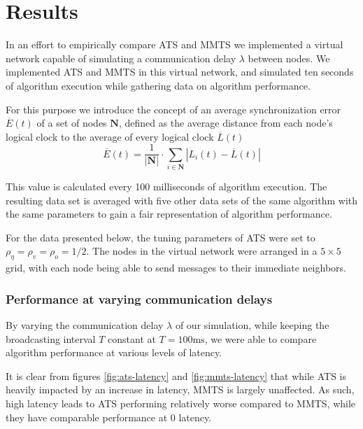 \documentclass[a4paper,12pt]{article}
\begin{document}
\section{Results}

In an effort to empirically compare ATS and MMTS we implemented a virtual network capable of simulating a communication delay $\lambda$ between nodes. We implemented ATS and MMTS in this virtual network, and simulated ten seconds of algorithm execution while gathering data on algorithm performance.

For this purpose we introduce the concept of an average synchronization error $\overline{E}(t)$ of a set of nodes $\boldsymbol{N}$, defined as the average distance from each node's logical clock to the average of every logical clock $\overline{L}(t)$ $$\overline{E}(t) = \frac{1}{|\boldsymbol{N}|} \cdot \sum_{i \in \boldsymbol{N}} \left| L_i(t) - \overline{L}(t) \right|$$

This value is calculated every 100 milliseconds of algorithm execution. The resulting data set is averaged with five other data sets of the same algorithm with the same parameters to gain a fair representation of algorithm performance.

For the data presented below, the tuning parameters of ATS were set to $\rho_\eta = \rho_v = \rho_o = 1 / 2$. The nodes in the virtual network were arranged in a $5\times5$ grid, with each node being able to send messages to their immediate neighbors.

\subsubsection{Performance at varying communication delays}
By varying the communication delay $\lambda$ of our simulation, while keeping the broadcasting interval $T$ constant at $T = 100 \text{ms}$, we were able to compare algorithm performance at various levels of latency.

It is clear from figures \ref{fig:ats-latency} and \ref{fig:mmts-latency} that while ATS is heavily impacted by an increase in latency, MMTS is largely unaffected. As such, high latency leads to ATS performing relatively worse compared to MMTS, while they have comparable performance at $0$ latency.
\end{document}
